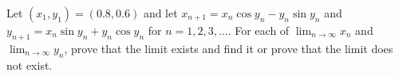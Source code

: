 Let $(x_1,y_1) = (0.8, 0.6)$ and let $x_{n+1} = x_n \cos y_n - y_n
\sin y_n$ and $y_{n+1}= x_n \sin y_n + y_n \cos y_n$ for
$n=1,2,3,\dots$. For each of $\lim_{n\to \infty} x_n$ and $\lim_{n \to
\infty} y_n$, prove that the limit exists and find it or prove that
the limit does not exist.
